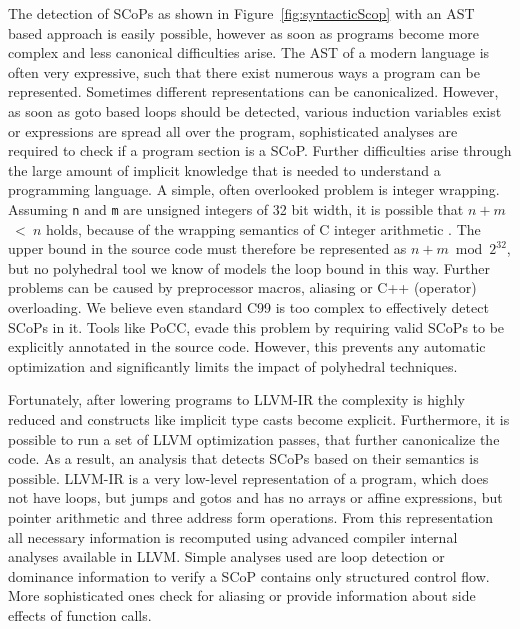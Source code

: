 The detection of SCoPs as shown in Figure~\ref{fig:syntacticScop} with an AST
based approach is easily possible, however as soon as programs become more
complex and less canonical difficulties arise. The AST of a modern language is
often very expressive, such that there exist numerous ways a program can be
represented.  Sometimes different representations can be canonicalized.
However, as soon as goto based loops should be detected, various induction
variables exist or expressions are spread all over the program, sophisticated
analyses are required to check if a program section is a SCoP. Further
difficulties arise through the large amount of implicit knowledge that is
needed to understand a programming language.  A simple, often overlooked problem is integer
wrapping.  Assuming \texttt{n} and \texttt{m} are unsigned integers of 32 bit
width, it is possible that $n+m$~<~$n$ holds, because of the wrapping semantics
of C integer arithmetic \cite{c99}. The upper bound in the source code must
therefore be represented as $n+m\bmod 2^{32}$, but no polyhedral tool we know
of models the loop bound in this way. Further problems can be caused by
preprocessor macros, aliasing or C++ (operator) overloading. We believe even
standard C99 is too complex to effectively detect SCoPs in it. Tools like PoCC,
evade this problem by requiring valid SCoPs to be explicitly annotated in the
source code. However, this prevents any automatic optimization and
significantly limits the impact of polyhedral techniques.

Fortunately, after lowering programs to LLVM-IR the complexity is highly
reduced and constructs like implicit type casts become explicit. Furthermore,
it is possible to run a set of LLVM optimization passes, that further
canonicalize the code.  As a result, an
analysis that detects SCoPs based on their semantics is possible.  LLVM-IR is a
very low-level representation of a program, which does not have loops, but
jumps and gotos and has no arrays or affine expressions, but pointer arithmetic
and three address form operations. From this representation all necessary
information is recomputed using advanced compiler internal analyses available
in LLVM. Simple analyses used are loop detection or dominance information to
verify a SCoP contains only structured control flow. More sophisticated ones
check for aliasing or provide information about side effects of
function calls. 

